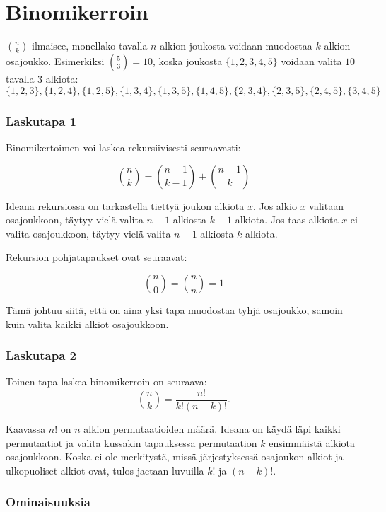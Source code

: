 \section{Binomikerroin}


 ${n \choose k}$ ilmaisee,
monellako tavalla $n$ alkion joukosta
voidaan muodostaa $k$ alkion osajoukko.
Esimerkiksi ${5 \choose 3}=10$,
koska joukosta $\{1,2,3,4,5\}$
voidaan valita $10$ tavalla $3$ alkiota:
\[ \{1,2,3\}, \{1,2,4\}, \{1,2,5\}, \{1,3,4\}, \{1,3,5\}, 
\{1,4,5\}, \{2,3,4\}, \{2,3,5\}, \{2,4,5\}, \{3,4,5\} \]

\subsubsection{Laskutapa 1}

Binomikertoimen voi laskea rekursiivisesti seuraavasti:

\[
{n \choose k}  =  {n-1 \choose k-1} + {n-1 \choose k}
\]

Ideana rekursiossa on tarkastella tiettyä
joukon alkiota $x$.
Jos alkio $x$ valitaan osajoukkoon,
täytyy vielä valita $n-1$ alkiosta $k-1$ alkiota.
Jos taas alkiota $x$ ei valita osajoukkoon,
täytyy vielä valita $n-1$ alkiosta $k$ alkiota.

Rekursion pohjatapaukset ovat seuraavat:

\[
{n \choose 0}  =  {n \choose n} = 1
\]

Tämä johtuu siitä, että on aina yksi tapa
muodostaa tyhjä osajoukko,
samoin kuin valita kaikki alkiot osajoukkoon.

\subsubsection{Laskutapa 2}

Toinen tapa laskea binomikerroin on seuraava:
\[
{n \choose k}  =  \frac{n!}{k!(n-k)!}.
\]

Kaavassa $n!$ on $n$ alkion permutaatioiden määrä.
Ideana on käydä läpi kaikki permutaatiot
ja valita kussakin tapauksessa
permutaation $k$ ensimmäistä alkiota osajoukkoon.
Koska ei ole merkitystä,
missä järjestyksessä osajoukon alkiot
ja ulkopuoliset alkiot ovat,
tulos jaetaan luvuilla $k!$ ja $(n-k)!$.

\subsubsection{Ominaisuuksia}


